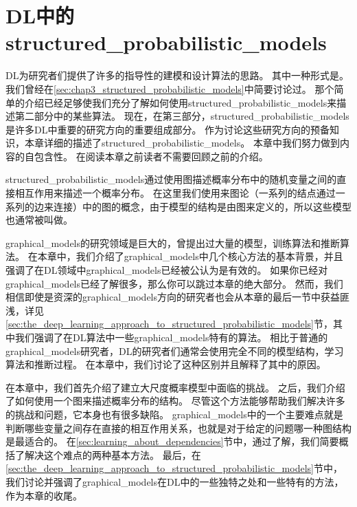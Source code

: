 \chapter{\gls{DL}中的\gls{structured_probabilistic_models}}
\label{chap:structured_probabilistic_models_for_deep_learning}


\gls{DL}为研究者们提供了许多的指导性的建模和设计算法的思路。
其中一种形式是。
我们曾经在\ref{sec:chap3_structured_probabilistic_models}中简要讨论过。
那个简单的介绍已经足够使我们充分了解如何使用\gls{structured_probabilistic_models}来描述第二部分中的某些算法。
现在，在第三部分，\gls{structured_probabilistic_models}是许多\gls{DL}中重要的研究方向的重要组成部分。
作为讨论这些研究方向的预备知识，本章详细的描述了\gls{structured_probabilistic_models}。
本章中我们努力做到内容的自包含性。
在阅读本章之前读者不需要回顾之前的介绍。


\gls{structured_probabilistic_models}通过使用图描述概率分布中的随机变量之间的直接相互作用来描述一个概率分布。
在这里我们使用来图论（一系列的结点通过一系列的边来连接）中的图的概念，由于模型的结构是由图来定义的，所以这些模型也通常被叫做。


\gls{graphical_models}的研究领域是巨大的，曾提出过大量的模型，训练算法和推断算法。
在本章中，我们介绍了\gls{graphical_models}中几个核心方法的基本背景，并且强调了在\gls{DL}领域中\gls{graphical_models}已经被公认为是有效的。
如果你已经对\gls{graphical_models}已经了解很多，那么你可以跳过本章的绝大部分。
然而，我们相信即使是资深的\gls{graphical_models}方向的研究者也会从本章的最后一节中获益匪浅，详见\ref{sec:the_deep_learning_approach_to_structured_probabilistic_models}节，其中我们强调了在\gls{DL}算法中一些\gls{graphical_models}特有的算法。
相比于普通的\gls{graphical_models}研究者，\gls{DL}的研究者们通常会使用完全不同的模型结构，学习算法和推断过程。
在本章中，我们讨论了这种区别并且解释了其中的原因。


在本章中，我们首先介绍了建立大尺度概率模型中面临的挑战。
之后，我们介绍了如何使用一个图来描述概率分布的结构。
尽管这个方法能够帮助我们解决许多的挑战和问题，它本身也有很多缺陷。
\gls{graphical_models}中的一个主要难点就是判断哪些变量之间存在直接的相互作用关系，也就是对于给定的问题哪一种图结构是最适合的。
在\ref{sec:learning_about_dependencies}节中，通过了解，我们简要概括了解决这个难点的两种基本方法。
最后，在\ref{sec:the_deep_learning_approach_to_structured_probabilistic_models}节中，我们讨论并强调了\gls{graphical_models}在\gls{DL}中的一些独特之处和一些特有的方法，作为本章的收尾。



